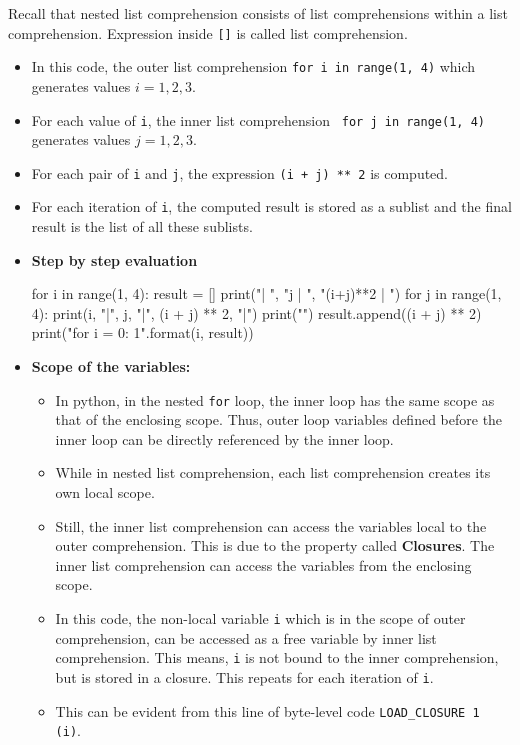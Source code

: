 \documentclass[10pt]{extarticle}
\begin{document}
Recall that nested list comprehension consists of list comprehensions within a list comprehension. Expression inside \texttt{[]} is called list comprehension.
\begin{itemize}
    \item In this code, the outer list comprehension \colorbox{gray!20}{\texttt{for i in range(1, 4)}}
    which generates values $i = 1,2,3$.
    \item For each value of \texttt{i}, the inner list comprehension \colorbox{gray!20}{\texttt{ for j in range(1, 4)}}
    generates values $j = 1,2,3$.
    \item For each pair of \texttt{i} and \texttt{j}, the expression \colorbox{gray!20}{\texttt{(i + j) ** 2}} is computed.
    \item For each iteration of \texttt{i}, the computed result is stored as a sublist and the final result is the list of all these sublists.
    \item \textbf{Step by step evaluation}
    \begin{tcolorbox}[colback=gray!20, colframe=gray!50, sharp corners=southwest]
    \begin{pycode}
for i in range(1, 4):
    result = []
    print("\ni  | ", "j  | ", "(i+j)**2 | \n")
    for j in range(1, 4):
        print(i, "|", j, "|", (i + j) ** 2, "|")
        print("\n")
        result.append((i + j) ** 2)
    print("\nSublist for i = {0}: {1}\n".format(i, result))
    \end{pycode}
    \end{tcolorbox}
    \item \textbf{Scope of the variables:} 
    \begin{itemize}
        \item In python, in the nested \texttt{for} loop, the inner loop has the same scope as that of the enclosing scope. Thus, outer loop variables defined before the inner loop can be directly referenced by the inner loop.   
        \item While in nested list comprehension, each list comprehension creates its own local scope. 
        \item Still, the inner list comprehension can access the variables local to the outer comprehension. This is due to the property called \textbf{Closures}. The inner list comprehension can access the variables from the enclosing scope.
        \item In this code, the non-local variable \texttt{i} which is in the scope of outer comprehension,  can be accessed as a free variable by inner list comprehension. This means, \texttt{i} is not bound to the inner comprehension, but is stored in a closure. This repeats for each iteration of \texttt{i}.
        \item This can be evident from this line of byte-level code  \colorbox{gray!20}{\texttt{LOAD\_CLOSURE 1 (i)}}.
    \end{itemize}
    
\end{itemize} 
\bigskip  
\end{document}
